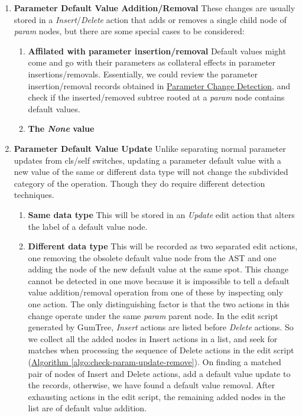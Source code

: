 \begin{enumerate}
	\item \textbf{Parameter Default Value Addition/Removal} These changes are usually stored in a \textit{Insert}/\textit{Delete} action that adds or removes a single child node of \textit{param} nodes, but there are some special cases to be considered:
	\begin{enumerate}
		\item \textbf{Affilated with parameter insertion/removal} Default values might come and go with their parameters as collateral effects in parameter insertions/removals. Essentially, we could review the parameter insertion/removal records obtained in \hyperref[subsec:param-change-detect]{Parameter Change Detection}, and check if the inserted/removed subtree rooted at a \textit{param} node contains default values.
		\item \textbf{The \textit{None} value}
	\end{enumerate}
	\item \textbf{Parameter Default Value Update} Unlike separating normal parameter updates from cls/self switches, updating a parameter default value with a new value of the same or different data type will not change the subdivided category of the operation. Though they do require different detection techniques.
	\begin{enumerate}
		\item \textbf{Same data type} This will be stored in an \textit{Update} edit action that alters the label of a default value node.
		\item \textbf{Different data type} This will be recorded as two separated edit actions, one removing the obsolete default value node from the AST and one adding the node of the new default value at the same spot. This change cannot be detected in one move because it is impossible to tell a default value addition/removal operation from one of these by inspecting only one action. The only distinguishing factor is that the two actions in this change operate under the same \textit{param} parent node. In the edit script generated by GumTree, \textit{Insert} actions are listed before \textit{Delete} actions. So we collect all the added nodes in Insert actions in a list, and seek for matches when processing the sequence of Delete actions in the edit script (\hyperref[algo:check-param-update-remove]{Algorithm \ref*{algo:check-param-update-remove}}). On finding a matched pair of nodes of Insert and Delete actions, add a default value update to the records, otherwise, we have found a default value removal. After exhausting actions in the edit script, the remaining added nodes in the list are of default value addition.
	\end{enumerate}
\end{enumerate}

